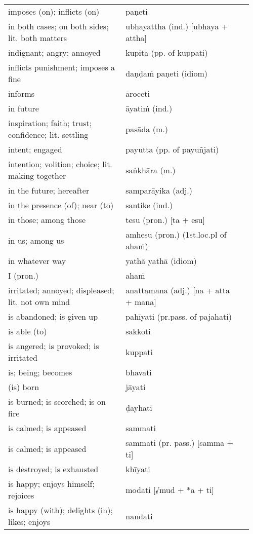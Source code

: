 \documentclass[a5paper]{memoir}
\begin{document}
\begin{longtable}{L{0.48\linewidth} L{0.48\linewidth} H}
imposes (on); inflicts (on) & paṇeti & \\[0pt]
in both cases; on both sides; lit. both matters & ubhayattha (ind.) [ubhaya + attha] & \\[0pt]
indignant; angry; annoyed & kupita (pp. of kuppati) & \\[0pt]
inflicts punishment; imposes a fine & daṇḍaṁ paṇeti (idiom) & \\[0pt]
informs & āroceti & \\[0pt]
in future & āyatiṁ (ind.) & \\[0pt]
inspiration; faith; trust; confidence; lit. settling & pasāda (m.) & \\[0pt]
intent; engaged & payutta (pp. of payuñjati) & \\[0pt]
intention; volition; choice; lit. making together & saṅkhāra (m.) & \\[0pt]
in the future; hereafter & samparāyika (adj.) & \\[0pt]
in the presence (of); near (to) & santike (ind.) & \\[0pt]
in those; among those & tesu (pron.) [ta + esu] & \\[0pt]
in us; among us & amhesu (pron.) (1st.loc.pl of ahaṁ) & \\[0pt]
in whatever way & yathā yathā (idiom) & \\[0pt]
I (pron.) & ahaṁ & \\[0pt]
irritated; annoyed; displeased; lit. not own mind & anattamana (adj.) [na + atta + mana] & \\[0pt]
is abandoned; is given up & pahīyati (pr.pass. of pajahati) & \\[0pt]
is able (to) & sakkoti & \\[0pt]
is angered; is provoked; is irritated & kuppati & \\[0pt]
is; being; becomes & bhavati & \\[0pt]
(is) born & jāyati & \\[0pt]
is burned; is scorched; is on fire & ḍayhati & \\[0pt]
is calmed; is appeased & sammati & \\[0pt]
is calmed; is appeased & sammati (pr. pass.) [samma + ti] & \\[0pt]
is destroyed; is exhausted & khīyati & \\[0pt]
is happy; enjoys himself; rejoices & modati [√mud + *a + ti] & \\[0pt]
is happy (with); delights (in); likes; enjoys & nandati & \\[0pt]

\end{longtable}
\end{document}
